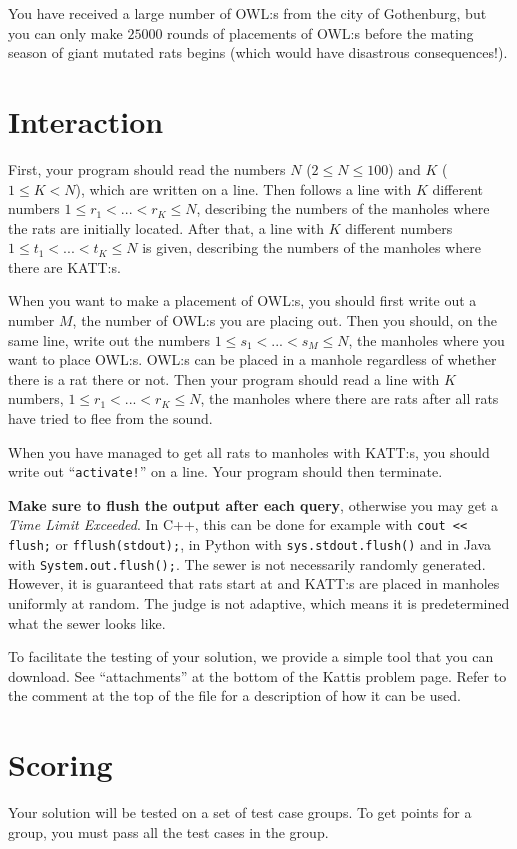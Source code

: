 You have received a large number of OWL:s from the city of Gothenburg, but you can only make $25000$ rounds of placements of OWL:s before
the mating season of giant mutated rats begins (which would have disastrous consequences!).

\section*{Interaction}
First, your program should read the numbers $N$ ($2 \leq N \leq 100$) and $K$ ($1 \leq K < N$), which are written on a line.
Then follows a line with $K$ different numbers $1 \leq r_1 < ... < r_K \leq N$, describing the numbers of the manholes where the rats are initially located.
After that, a line with $K$ different numbers $1 \leq t_1 < ... < t_K \leq N$ is given, describing the numbers of the manholes where there are KATT:s.

When you want to make a placement of OWL:s, you should first write out a number $M$, the number of OWL:s you are placing out.
Then you should, on the same line, write out the numbers $1 \leq s_1 < ... < s_M \leq N$,
the manholes where you want to place OWL:s. OWL:s can be placed in a manhole regardless of whether there is a rat there or not.
Then your program should read a line with $K$ numbers, $1 \leq r_1 < ... < r_K \leq N$,
the manholes where there are rats after all rats have tried to flee from the sound.

When you have managed to get all rats to manholes with KATT:s, you should write out ``\texttt{activate!}'' on a line.
Your program should then terminate.

\textbf{Make sure to flush the output after each query}, otherwise you may get a \textit{Time Limit Exceeded}.
In C++, this can be done for example with \texttt{cout << flush;}
or \texttt{fflush(stdout);},
in Python with \texttt{sys.stdout.flush()}
and in Java with \texttt{System.out.flush();}.
The sewer is not necessarily randomly generated.
However, it is guaranteed that rats start at and KATT:s are placed in manholes uniformly at random.
The judge is not adaptive, which means it is predetermined what the sewer looks like.

To facilitate the testing of your solution, we provide a simple tool that you can download. See ``attachments''
at the bottom of the Kattis problem page. Refer to the comment at the top of the file for a description of how it can be used.

\section*{Scoring}
Your solution will be tested on a set of test case groups.
To get points for a group, you must pass all the test cases in the group.

